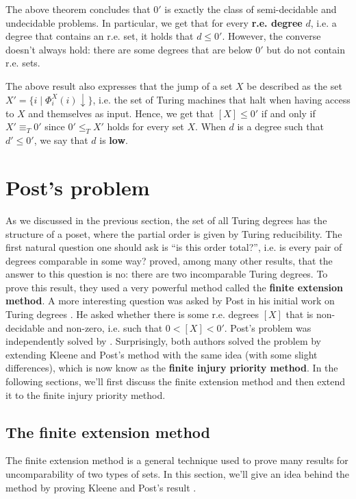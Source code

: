 \documentclass[12pt,a4paper]{article}
\theoremstyle{definition}
\newcommand{\curlyquotes}[1]{\textquotedblleft #1\textquotedblright}
\begin{document}
    The above theorem concludes that $0'$ is exactly the class of semi-decidable and undecidable problems. In particular, we get that for every \textbf{r.e. degree} $d$, i.e. a degree that contains an r.e. set, it holds that $d \leq 0'$. However, the converse doesn't always hold: there are some degrees that are below $0'$ but do not contain r.e. sets. 
    
    The above result also expresses that the jump of a set $X$ be described as the set $X' = \{i \mid \Phi^X_i(i) \downarrow\}$, i.e. the set of Turing machines that halt when having access to $X$ and themselves as input. Hence, we get that $[X] \leq 0'$ if and only if $X' \equiv_T 0'$ since $0' \leq_T X'$ holds for every set $X$. When $d$ is a degree such that $d' \leq 0'$, we say that $d$ is \textbf{low}.

    \section{Post's problem}
    
    As we discussed in the previous section, the set of all Turing degrees has the structure of a poset, where the partial order is given by Turing reducibility. The first natural question one should ask is \curlyquotes{is this order total?}, i.e. is every pair of degrees comparable in some way? \textcite{kleene_post} proved, among many other results, that the answer to this question is no: there are two incomparable Turing degrees. To prove this result, they used a very powerful method called the \textbf{finite extension method}. A more interesting question was asked by Post in his initial work on Turing degrees \cite{post_degrees}. He asked whether there is some r.e. degrees $[X]$ that is non-decidable and non-zero, i.e. such that $0 < [X] < 0'$. Post's problem was independently solved by \textcite{friedberg, muchnik}. Surprisingly, both authors solved the problem by extending Kleene and Post's method with the same idea (with some slight differences), which is now know as the \textbf{finite injury priority method}. In the following sections, we'll first discuss the finite extension method and then extend it to the finite injury priority method.

    \subsection{The finite extension method}

    The finite extension method is a general technique used to prove many results for uncomparability of two types of sets. In this section, we'll give an idea behind the method by proving Kleene and Post's result \cite{kleene_post}.
    
\end{document}

